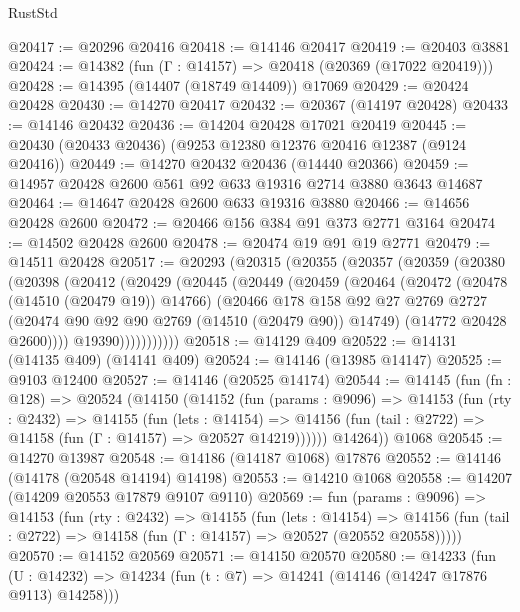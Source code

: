 \begin{lexlean}{RustStd}
\begin{coremodule}
@20417 := @20296 @20416
@20418 := @14146 @20417
@20419 := @20403 @3881
@20424 := @14382 (fun (Γ : @14157) => @20418 (@20369 (@17022 @20419)))
@20428 := @14395 (@14407 (@18749 @14409)) @17069
@20429 := @20424 @20428
@20430 := @14270 @20417
@20432 := @20367 (@14197 @20428)
@20433 := @14146 @20432
@20436 := @14204 @20428 @17021 @20419
@20445 := @20430 (@20433 @20436) (@9253 @12380 @12376 @20416 @12387 (@9124 @20416))
@20449 := @14270 @20432 @20436 (@14440 @20366)
@20459 := @14957 @20428 @2600 @561 @92 @633 @19316 @2714 @3880 @3643 @14687
@20464 := @14647 @20428 @2600 @633 @19316 @3880
@20466 := @14656 @20428 @2600
@20472 := @20466 @156 @384 @91 @373 @2771 @3164
@20474 := @14502 @20428 @2600
@20478 := @20474 @19 @91 @19 @2771
@20479 := @14511 @20428
@20517 := @20293
    (@20315
      (@20355
        (@20357
          (@20359
            (@20380
              (@20398
                (@20412
                  (@20429
                    (@20445
                      (@20449
                        (@20459
                          (@20464
                            (@20472
                              (@20478 (@14510 (@20479 @19)) @14766)
                              (@20466
                                @178
                                @158
                                @92
                                @27
                                @2769
                                @2727
                                (@20474 @90 @92 @90 @2769 (@14510 (@20479 @90)) @14749)
                                (@14772 @20428 @2600))))
                          @19390)))))))))))
@20518 := @14129 @409
@20522 := @14131 (@14135 @409) (@14141 @409)
@20524 := @14146 (@13985 @14147)
@20525 := @9103 @12400
@20527 := @14146 (@20525 @14174)
@20544 := @14145
    (fun (fn : @128) =>
    @20524
      (@14150
        (@14152
          (fun (params : @9096) =>
          @14153
            (fun (rty : @2432) =>
            @14155
              (fun (lets : @14154) =>
              @14156 (fun (tail : @2722) => @14158 (fun (Γ : @14157) => @20527 @14219))))))
        @14264))
    @1068
@20545 := @14270 @13987
@20548 := @14186 (@14187 @1068) @17876
@20552 := @14146 (@14178 (@20548 @14194) @14198)
@20553 := @14210 @1068
@20558 := @14207 (@14209 @20553 @17879 @9107 @9110)
@20569 := fun (params : @9096) =>
  @14153
    (fun (rty : @2432) =>
    @14155
      (fun (lets : @14154) =>
      @14156 (fun (tail : @2722) => @14158 (fun (Γ : @14157) => @20527 (@20552 @20558)))))
@20570 := @14152 @20569
@20571 := @14150 @20570
@20580 := @14233
    (fun (U : @14232) => @14234 (fun (t : @7) => @14241 (@14146 (@14247 @17876 @9113) @14258)))

\end{coremodule}
\end{lexlean}
